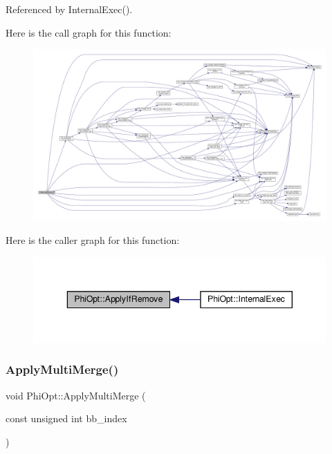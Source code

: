 Referenced by Internal\+Exec().

Here is the call graph for this function\+:
\nopagebreak
\begin{figure}[H]
\begin{center}
\leavevmode
\includegraphics[width=350pt]{dc/ddf/classPhiOpt_a5d3aca47ec2f9f675c2f6ffbe2a5eef0_cgraph}
\end{center}
\end{figure}
Here is the caller graph for this function\+:
\nopagebreak
\begin{figure}[H]
\begin{center}
\leavevmode
\includegraphics[width=343pt]{dc/ddf/classPhiOpt_a5d3aca47ec2f9f675c2f6ffbe2a5eef0_icgraph}
\end{center}
\end{figure}
\mbox{\label{classPhiOpt_ae4b11dc6285655c89d79ef38bb635374}} 
\subsubsection{\texorpdfstring{Apply\+Multi\+Merge()}{ApplyMultiMerge()}}
{\footnotesize\ttfamily void Phi\+Opt\+::\+Apply\+Multi\+Merge (\begin{DoxyParamCaption}\item[{const unsigned int}]{bb\+\_\+index }\end{DoxyParamCaption})\hspace{0.3cm}{\ttfamily [private]}}



